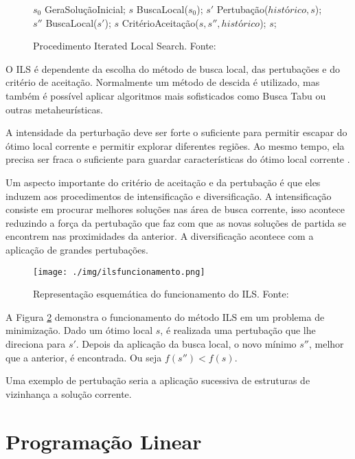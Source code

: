 \begin{figure}[h]
\caption{Procedimento Iterated Local Search. \mbox{Fonte:
\cite{notasmarcone}}}\label{alg:ils}
\begin{programma}
\STATE $s_{0}$ \GETS GeraSoluçãoInicial;
\STATE $s$ \GETS BuscaLocal($s_{0}$);
\STATE $s{'}$ \GETS Pertubação($histórico, s$);
\STATE $s{''}$ \GETS BuscaLocal($s{'}$);
\STATE $s$ \GETS CritérioAceitação($s, s{''}, histórico$);
\ENDWHILE
\STATE\RETURN $s$;
\ENDALGORITHM
\end{programma}
\end{figure}

O ILS é dependente da escolha do método de busca local, das pertubações e do critério de aceitação. Normalmente um método de descida é utilizado, mas também é possível aplicar algoritmos mais sofisticados como Busca Tabu ou outras metaheurísticas.

A intensidade da perturbação deve ser forte o suficiente para permitir escapar do ótimo
local corrente e permitir explorar diferentes regiões. Ao mesmo tempo, ela precisa ser fraca
o suficiente para guardar características do ótimo local corrente \cite{notasmarcone}.

Um aspecto importante do critério de aceitação e da pertubação é que eles induzem aos procedimentos de intensificação e diversificação. A intensificação consiste em procurar melhores soluções nas área de busca corrente, isso acontece reduzindo a força da pertubação que faz com que as novas soluções de partida se encontrem nas proximidades da anterior. A diversificação acontece com a aplicação de grandes pertubações.

\begin{figure}[ht]
	\caption{Representação esquemática do funcionamento do ILS. \mbox{Fonte:
	\cite{notasmarcone}}}
	\label{img:ilsfuncionamento}
	\texttt{[image: ./img/ilsfuncionamento.png]}
\end{figure}

A Figura \ref{img:ilsfuncionamento} demonstra o funcionamento do método ILS em um problema de minimização. Dado um ótimo local $s$, é realizada uma pertubação que lhe direciona para $s{'}$. Depois da aplicação da busca local, o novo mínimo $s{''}$, melhor que a anterior, é encontrada. Ou seja $f(s{''}) < f(s)$.

Uma exemplo de pertubação seria a aplicação sucessiva de estruturas de vizinhança a solução corrente.

\section{Programação Linear}

